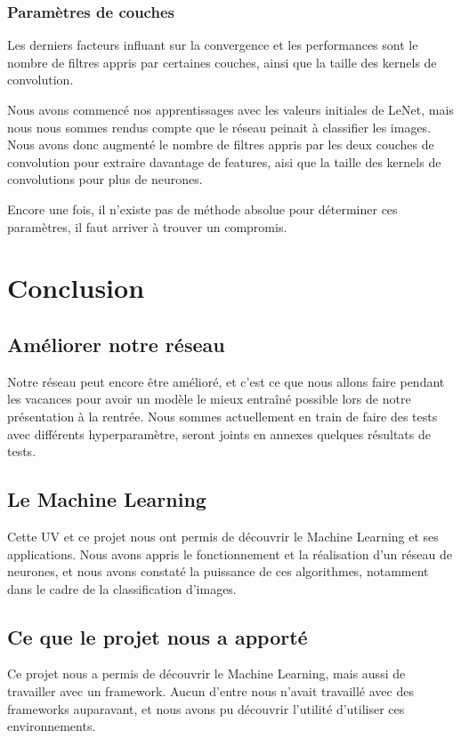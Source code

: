\documentclass[a4paper,12pt]{article}
\begin{document}
    \subsubsection{Paramètres de couches}
      Les derniers facteurs influant sur la convergence et les performances sont le nombre de filtres appris par certaines couches, ainsi que la taille des kernels de convolution. 

      Nous avons commencé nos apprentissages avec les valeurs initiales de LeNet, mais nous nous sommes rendus compte que le réseau peinait à classifier les images. Nous avons donc augmenté le nombre de filtres appris par les deux couches de convolution pour extraire davantage de features, aisi que la taille des kernels de convolutions pour plus de neurones. 

      Encore une fois, il n'existe pas de méthode absolue pour déterminer ces paramètres, il faut arriver à trouver un compromis.

\newpage
\section*{Conclusion}
  
  \subsection*{Améliorer notre réseau}
    Notre réseau peut encore être amélioré, et c'est ce que nous allons faire pendant les vacances pour avoir un modèle le mieux entraîné possible lors de notre présentation à la rentrée. Nous sommes actuellement en train de faire des tests avec différents hyperparamètre, seront joints en annexes quelques résultats de tests.
  
  \subsection*{Le Machine Learning}
    Cette UV et ce projet nous ont permis de découvrir le Machine Learning et ses applications. Nous avons appris le fonctionnement et la réalisation d'un réseau de neurones, et nous avons constaté la puissance de ces algorithmes, notamment dans le cadre de la classification d'images.
  
  \subsection*{Ce que le projet nous a apporté}
    Ce projet nous a permis de découvrir le Machine Learning, mais aussi de travailler avec un framework. Aucun d'entre nous n'avait travaillé avec des frameworks auparavant, et nous avons pu découvrir l'utilité d'utiliser ces environnements.
\end{document}
